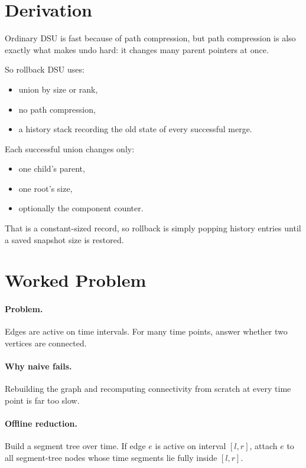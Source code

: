 \section*{Derivation}

Ordinary DSU is fast because of path compression, but path compression is also exactly what makes undo hard: it changes
many parent pointers at once.

So rollback DSU uses:

\begin{itemize}
  \item union by size or rank,
  \item no path compression,
  \item a history stack recording the old state of every successful merge.
\end{itemize}

Each successful union changes only:

\begin{itemize}
  \item one child's parent,
  \item one root's size,
  \item optionally the component counter.
\end{itemize}

That is a constant-sized record, so rollback is simply popping history entries until a saved snapshot size is restored.

\section*{Worked Problem}

\paragraph{Problem.}
Edges are active on time intervals. For many time points, answer whether two vertices are connected.

\paragraph{Why naive fails.}
Rebuilding the graph and recomputing connectivity from scratch at every time point is far too slow.

\paragraph{Offline reduction.}
Build a segment tree over time. If edge \(e\) is active on interval \([l,r]\), attach \(e\) to all segment-tree nodes
whose time segments lie fully inside \([l,r]\).

